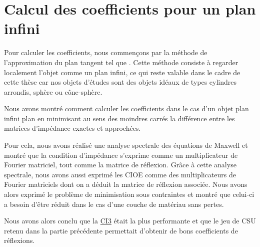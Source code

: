 \chapter{Calcul des coefficients pour un plan infini}
\label{sec:plan}
\minitoc
\newpage
{}
Pour calculer les coefficients, nous commençons par la méthode de l'approximation du plan tangent tel que \cite{hoppe_impedance_1995}. Cette méthode consiste à regarder localement l'objet comme un plan infini, ce qui reste valable dans le cadre de cette thèse car nos objets d'études sont des objets idéaux de types cylindres arrondis, sphère ou cône-sphère.







Nous avons montré comment calculer les coefficients dans le cas d'un objet plan infini plan en minimisant au sens des moindres carrés la différence entre les matrices d'impédance exactes et approchées. 

Pour cela, nous avons réalisé une analyse spectrale des équations de Maxwell et montré que la condition d'impédance s'exprime comme un multiplicateur de Fourier matriciel, tout comme la matrice de réflexion. Grâce à cette analyse spectrale, nous avons aussi exprimé les CIOE comme des multiplicateurs de Fourier matriciels dont on a déduit la matrice de réflexion associée. Nous avons alors exprimé le problème de minimisation sous contraintes et montré que celui-ci a besoin d'être réduit dans le cas d'une couche de matériau sans pertes.

Nous avons alors conclu que la \hyperlink{ci3}{CI3} était la plus performante et que le jeu de CSU retenu dans la partie précédente permettait d'obtenir de bons coefficients de réflexions.
